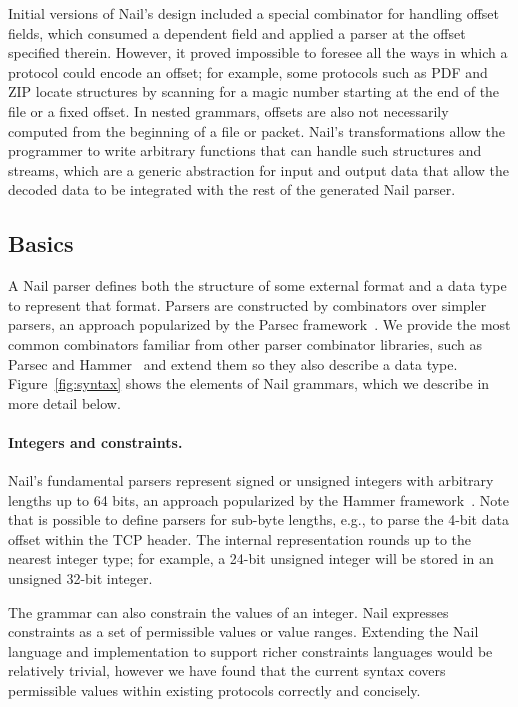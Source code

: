 Initial versions of Nail's design included a special combinator for handling offset fields,
which consumed a dependent field and applied
a parser at the offset specified therein. However, it proved impossible to foresee all the ways in which a protocol could encode an offset;
for example, some protocols such as PDF and ZIP locate structures by scanning for a magic number starting at the
end of the file or a fixed offset. In nested grammars, offsets are also not necessarily computed from
the beginning of a file or packet.
Nail's transformations allow the programmer to write arbitrary functions that can
handle such structures and streams, which are a generic abstraction for input and
output data that allow the decoded data to be integrated with the rest of the
generated Nail parser.




\subsection{Basics}

A Nail parser defines both the structure of some external format and a data type to represent that
format. Parsers are constructed by combinators over simpler parsers, an approach popularized by the Parsec
framework~\cite{LeijenMeijer:parsec}. We provide the most common combinators familiar from other parser
 combinator libraries, such as Parsec and Hammer~\cite{hammer-parser} and extend them so they also
 describe a data type. 
Figure~\ref{fig:syntax} shows the elements of Nail grammars, which we describe in more detail below.

\paragraph{Integers and constraints.}

Nail's fundamental parsers represent signed or unsigned
integers with arbitrary lengths up to 64 bits, an
approach popularized by the Hammer framework~\cite{hammer-parser}.
Note that is possible to define parsers for sub-byte lengths, e.g.,
to parse the 4-bit
data offset within the TCP header.  The internal representation rounds up to the nearest integer
type; for example, a 24-bit unsigned integer will be stored in an unsigned 32-bit integer.

The grammar can also constrain the values of an integer.  Nail expresses
constraints as a set of permissible values or value ranges. Extending the Nail language and
implementation to support richer constraints languages would be relatively trivial, however we have
found that the current syntax covers permissible values within existing protocols correctly and
concisely.


